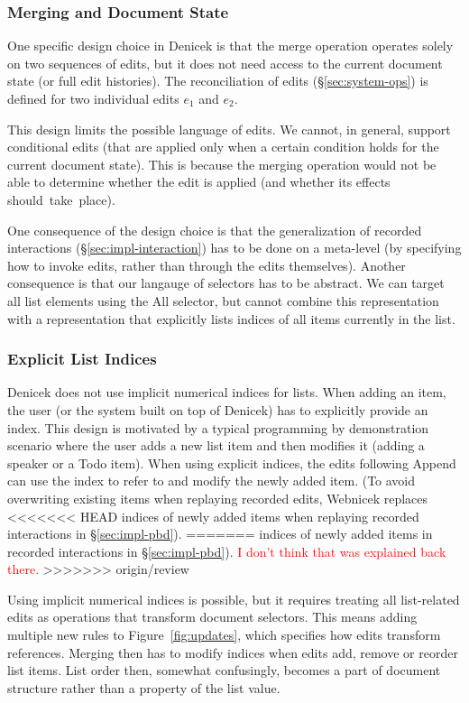 \documentclass[sigconf,anonymous,screen]{acmart}
\newcommand{\ident}[1]{{\sffamily #1}}
\newcommand{\note}[1]{\textcolor{red}{#1}}
\begin{document}
\subsubsection*{Merging and Document State}
One specific design choice in Denicek is that the merge operation operates solely on two
sequences of edits, but it does not need access to the current document state (or full edit
histories). The reconciliation of edits (\S\ref{sec:system-ops}) is defined for two individual
edits $e_1$ and $e_2$.

This design limits the possible language of edits. We cannot, in general, support
conditional edits (that are applied only when a certain condition holds for
the current document state). This is because the merging operation would not be able to
determine whether the edit is applied (and whether its effects should~take~place).

One consequence of the design choice is that the generalization of recorded interactions (\S\ref{sec:impl-interaction}) has to
be done on a meta-level (by specifying how to invoke edits, rather than through the edits themselves).
Another consequence is that our langauge of selectors has to be abstract.
We can target all list elements using the \ident{All} selector, but cannot combine this
representation with a representation that explicitly lists indices of all items currently in the list.

\subsubsection*{Explicit List Indices}
Denicek does not use implicit numerical indices for lists. When adding an item, the
user (or the system built on top of Denicek) has to explicitly provide an index. This design
is motivated by a typical programming by demonstration scenario where the user adds a
new list item and then modifies it (adding a speaker or a Todo item). When using explicit indices,
the edits following \ident{Append} can use the index to refer to and modify the newly added
item. (To avoid overwriting existing items when replaying recorded edits, Webnicek replaces
<<<<<<< HEAD
indices of newly added items when replaying recorded interactions in \S\ref{sec:impl-pbd}).
=======
indices of newly added items in recorded interactions in \S\ref{sec:impl-pbd}). \note{I don't think that was explained back there.}
>>>>>>> origin/review

Using implicit numerical indices is possible, but it requires treating all list-related edits
as operations that transform document selectors. This means adding multiple new rules to
Figure~\ref{fig:updates}, which specifies how edits transform references. Merging then has to
modify indices when edits add, remove or reorder list items. List order then, somewhat confusingly,
becomes a part of document structure rather than a property of the list value.
\end{document}
